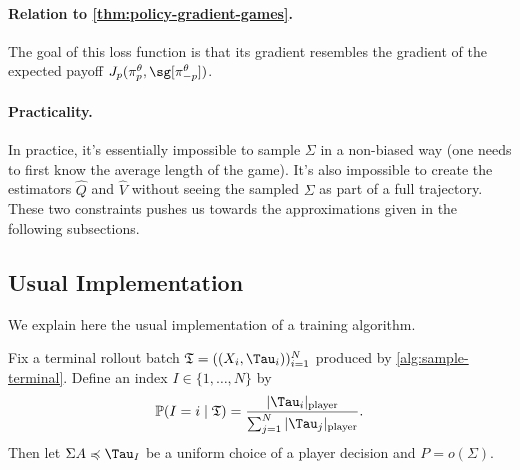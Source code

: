 \documentclass[12pt, a4paper]{article}
\begin{document}
\paragraph{Relation to \autoref{thm:policy-gradient-games}.}
The goal of this loss function is that its gradient resembles the gradient of the expected payoff $J_p(\pi^\theta_p, \sg[\pi^\theta_{-p}])$.

\paragraph{Practicality.}
In practice, it's essentially impossible to sample $\Sigma$ in a non-biased way (one needs to first know the average length of the game).
It's also impossible to create the estimators $\widehat{Q}$ and $\widehat{V}$ without seeing the sampled $\Sigma$ as part of a full trajectory.
These two constraints pushes us towards the approximations given in the following subsections.

\subsection{Usual Implementation}\label{subsec:pg-usual-implementation}

We explain here the usual implementation of a training algorithm.

\begin{algorithm}[H]
\caption{$\mathfrak{T}\gets$~\texttt{SampleTerminal}$(\pi,N)$}
\label{alg:sample-terminal}
\DontPrintSemicolon
{}
\end{algorithm}

\begin{definition}\label{def:terminal-rollout-decision-law}
Fix a terminal rollout batch $\mathfrak{T}=((X_i,\Tau_i))_{i=1}^N$ produced by \cref{alg:sample-terminal}.
Define an index $I\in\{1,\ldots,N\}$ by
\begin{equation}\label{eq:terminal-rollout-index-law}
  \mathbb{P}(I=i\mid\mathfrak{T})
  =
  \frac{|\Tau_i|_{\textnormal{player}}}
       {\sum_{j=1}^N|\Tau_j|_{\textnormal{player}}}.
\end{equation}
Then let $\Sigma A \preccurlyeq \Tau_I$ be a uniform choice of a player decision and $P = o(\Sigma)$.
\end{definition}
\end{document}
